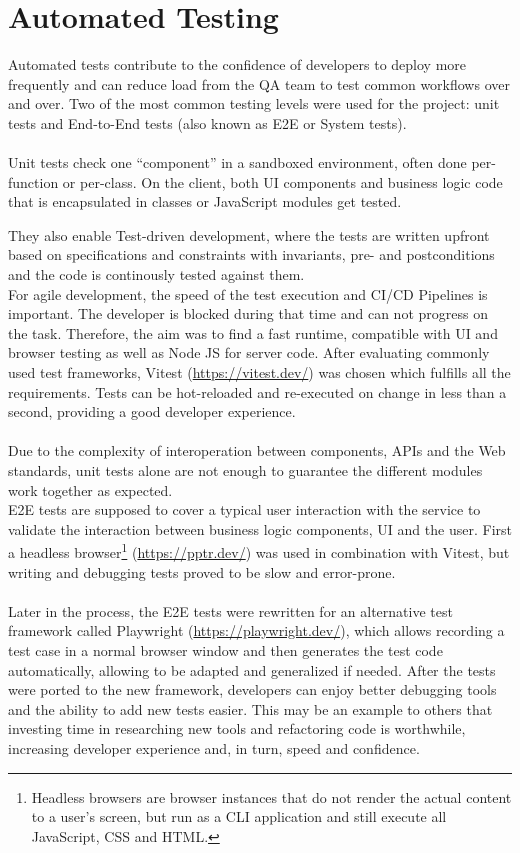 \section{Automated Testing}
\label{sec:automated-testing}

Automated tests contribute to the confidence of developers to deploy more frequently and can reduce load from the QA team to test common workflows over and over.
Two of the most common testing levels were used for the project: unit tests and End-to-End tests (also known as E2E or System tests).
\\\\
Unit tests check one ``component'' in a sandboxed environment, often done per-function or per-class.
On the client, both UI components and business logic code that is encapsulated in classes or JavaScript modules get tested.

They also enable Test-driven development, where the tests are written upfront based on specifications and constraints with invariants, pre- and postconditions and the code is continously tested against them.
\\
For agile development, the speed of the test execution and CI/CD Pipelines is important. The developer is blocked during that time and can not progress on the task.
Therefore, the aim was to find a fast runtime, compatible with UI and browser testing as well as Node JS for server code.
After evaluating commonly used test frameworks, Vitest (\url{https://vitest.dev/}) was chosen which fulfills all the requirements. Tests can be hot-reloaded and re-executed on change in less than a second, providing a good developer experience.
\\\\
Due to the complexity of interoperation between components, APIs and the Web standards, unit tests alone are not enough to guarantee the different modules work together as expected. 
\\
E2E tests are supposed to cover a typical user interaction with the service to validate the interaction between business logic components, UI and the user.
First a headless browser\footnote{Headless browsers are browser instances that do not render the actual content to a user's screen, but run as a CLI application and still execute all JavaScript, CSS and HTML.} (\url{https://pptr.dev/}) was used in combination with Vitest,
but writing and debugging tests proved to be slow and error-prone.
\\\\
Later in the process, the E2E tests were rewritten for an alternative test framework called Playwright (\url{https://playwright.dev/}), which allows recording a test case in a normal browser window and then generates the test code automatically, allowing to be adapted and generalized if needed.
After the tests were ported to the new framework, developers can enjoy better debugging tools and the ability to add new tests easier. This may be an example to others that investing time in researching new tools and refactoring code is worthwhile, increasing developer experience and, in turn, speed and confidence.

